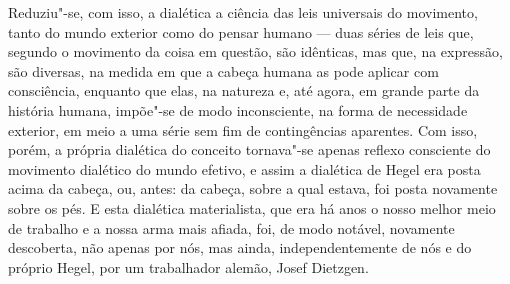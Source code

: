 Reduziu"-se, com isso, a dialética a ciência das leis universais do
movimento, tanto do mundo exterior como do pensar humano --- duas séries
de leis que, segundo o movimento da coisa em questão, são
idênticas, mas que, na expressão, são diversas, na medida em que a
cabeça humana as pode aplicar com consciência, enquanto que elas, na
natureza e, até agora, em grande parte da história humana,
impõe"-se de modo inconsciente, na forma de necessidade exterior, em meio
a uma série sem fim de contingências aparentes. Com isso, porém, a
própria dialética do conceito tornava"-se apenas reflexo consciente do
movimento dialético do mundo efetivo, e assim a dialética
de Hegel era
posta acima da cabeça, ou, antes: da 
cabeça, sobre a qual estava, foi posta novamente sobre os pés. E esta
dialética materialista, que era há anos o nosso melhor meio de trabalho
e a nossa arma mais afiada, foi, de modo notável, novamente descoberta,
não apenas por nós, mas ainda, independentemente de nós e do próprio
Hegel,
por um trabalhador
alemão, Josef Dietzgen.

